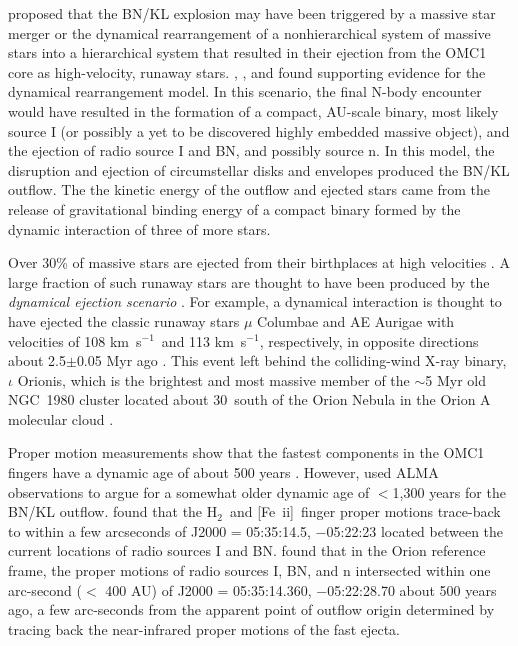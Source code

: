 \documentclass{aa}
\newcommand{\kms}{km~s{$^{-1}$}}
\newcommand{\Feii}{[Fe~{\sc ii}]}
\newcommand{\hh}{\ensuremath{\textrm{H}_{2}}}			%
\begin{document}
\citet{BallyZinnecker2005} proposed that the  BN/KL explosion may have
been triggered by a massive star merger or  the dynamical rearrangement 
of a nonhierarchical system of massive stars into a hierarchical system 
that resulted in their ejection from the OMC1 core as high-velocity, runaway stars.   
\citet{Zapata2009},  \citet{Bally2011}, and \citet{Goddi2011} found supporting 
evidence for the  dynamical  rearrangement model.    In this scenario, 
the final N-body encounter would have resulted in the formation 
of a compact, AU-scale binary,   most likely source I (or  possibly a yet to be 
discovered highly embedded  massive object), and the ejection of radio source 
I and BN, and possibly source n.     In this model,  the disruption and ejection of 
circumstellar  disks and envelopes  produced  the BN/KL outflow.  The  the 
kinetic energy of the outflow and ejected  stars came from the release of gravitational 
binding energy of a compact binary  formed  by the dynamic interaction of 
three of more stars.   

Over 30\% of massive stars are ejected from their birthplaces at high velocities
\citep{GiesBolton1986}.   A large fraction of such runaway stars are thought
to have been produced by the {\it dynamical ejection scenario}
\citep{PovedaRuizAllen1967}.    For example, a  dynamical  interaction
is thought to have ejected the classic runaway stars $\mu$ Columbae and
AE Aurigae with velocities of 108 \kms\  and 113 \kms ,  respectively,  in opposite
directions about 2.5$\pm$0.05 Myr ago \citep{Hoogerwerf2000, Hoogerwerf2001,
Gualandris2004}.    This event left behind the colliding-wind X-ray binary,
$\iota$ Orionis, which is the brightest and most massive member of the
$\sim$5 Myr old NGC~1980 cluster located about 30\arcmin\ south of the
Orion Nebula in the Orion A molecular cloud \citep{AlvesBouy2012,Bouy2014}.  

Proper motion  measurements show that the  fastest components in the  OMC1 
fingers have a  dynamic age of about 500  years \citep{Bally2011}.     However,   
\citet{Wu2014arXiv1} used ALMA observations to argue for a somewhat older
dynamic age of $<$1,300 years for the BN/KL outflow.    \citet{Bally2011} found 
that  the \hh\  and \Feii\  finger proper motions trace-back to within a 
few arcseconds of   J2000 = 05:35:14.5, $-$05:22:23 located between the current 
locations of  radio sources I and BN.     \citet{Gomez2008} found that in the Orion 
reference frame, the proper motions of radio sources I, BN, and n intersected 
within one arc-second ($<$ 400 AU) of  J2000 = 05:35:14.360, $-$05:22:28.70  
about 500 years ago, a few arc-seconds from the apparent point of outflow origin 
determined by tracing back the near-infrared proper motions of the fast ejecta. 
 
\end{document}
